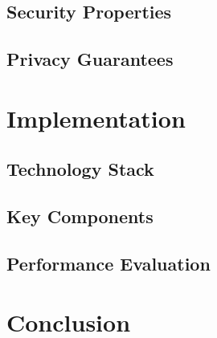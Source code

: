 \documentclass[conference]{IEEEtran}
\begin{document}
\subsection{Security Properties}
\subsection{Privacy Guarantees}

\section{Implementation}
\subsection{Technology Stack}
\subsection{Key Components}
\subsection{Performance Evaluation}

\section{Conclusion}



\end{document}
